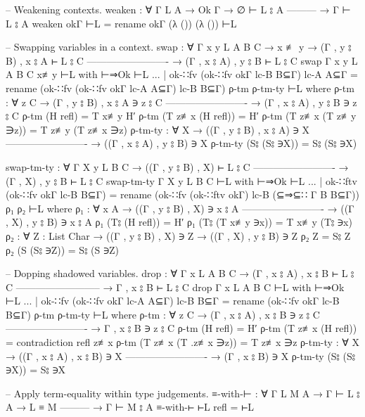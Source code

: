 \documentclass[logo,bsc,singlespacing,parskip,online]{infthesis}
\renewenvironment{code}{\mintedcopy[breaklines,breaksymbolleft=\;]{agda}}{\endmintedcopy}
\begin{document}
\begin{code}
  -- Weakening contexts.
  weaken : ∀ {Γ L A}
    → Ok Γ
    → ∅ ⊢ L ⦂ A
      ---------
    → Γ ⊢ L ⦂ A
  weaken okΓ ⊢L = rename okΓ (λ ()) (λ ()) ⊢L

  -- Swapping variables in a context.
  swap : ∀ {Γ x y L A B C}
    → x ≢ y
    → (Γ , y ⦂ B) , x ⦂ A ⊢ L ⦂ C
      -------------------------
    → (Γ , x ⦂ A) , y ⦂ B ⊢ L ⦂ C
  swap {Γ} {x} {y} {L} {A} {B} {C} x≢y ⊢L with ⊢⇒Ok ⊢L
  ... | ok-∷fv (ok-∷fv okΓ lc-B B⊆Γ) lc-A A⊆Γ =
    rename (ok-∷fv (ok-∷fv okΓ lc-A A⊆Γ) lc-B B⊆Γ) ρ-tm ρ-tm-ty ⊢L
    where
      ρ-tm : ∀ {z C}
        → (Γ , y ⦂ B) , x ⦂ A ∋ z ⦂ C
          -------------------------
        → (Γ , x ⦂ A) , y ⦂ B ∋ z ⦂ C
      ρ-tm (H refl) = T x≢y H′
      ρ-tm (T z≢x (H refl)) = H′
      ρ-tm (T z≢x (T z≢y ∋z)) = T z≢y (T z≢x ∋z)
      ρ-tm-ty : ∀ {X}
        → ((Γ , y ⦂ B) , x ⦂ A) ∋ X
          -------------------------
        → ((Γ , x ⦂ A) , y ⦂ B) ∋ X
      ρ-tm-ty (S⦂ (S⦂ ∋X)) = S⦂ (S⦂ ∋X)

  swap-tm-ty : ∀ {Γ X y L B C}
    → ((Γ , y ⦂ B) , X) ⊢ L ⦂ C
      -------------------------
    → (Γ , X) , y ⦂ B ⊢ L ⦂ C
  swap-tm-ty {Γ} {X} {y} {L} {B} {C} ⊢L with ⊢⇒Ok ⊢L
  ... | ok-∷ftv (ok-∷fv okΓ lc-B B⊆Γ) = rename (ok-∷fv (ok-∷ftv okΓ) lc-B (⊆⇒⊆∷ {Γ} {B} B⊆Γ)) ρ₁ ρ₂ ⊢L
    where
      ρ₁ : ∀ {x A}
        → ((Γ , y ⦂ B) , X) ∋ x ⦂ A
          -------------------------
        → ((Γ , X) , y ⦂ B) ∋ x ⦂ A
      ρ₁ (T⦂ (H refl)) = H′
      ρ₁ (T⦂ (T x≢y ∋x)) = T x≢y (T⦂ ∋x)
      ρ₂ : ∀ {Z : List Char}
        → ((Γ , y ⦂ B) , X) ∋ Z
        → ((Γ , X) , y ⦂ B) ∋ Z
      ρ₂ Z = S⦂ Z
      ρ₂ (S (S⦂ ∋Z)) = S⦂ (S ∋Z)

  -- Dopping shadowed variables.
  drop : ∀ {Γ x L A B C}
    → (Γ , x ⦂ A) , x ⦂ B ⊢ L ⦂ C
      --------------------------
    → Γ , x ⦂ B ⊢ L ⦂ C
  drop {Γ} {x} {L} {A} {B} {C} ⊢L with ⊢⇒Ok ⊢L
  ... | ok-∷fv (ok-∷fv okΓ lc-A A⊆Γ) lc-B B⊆Γ =
    rename (ok-∷fv okΓ lc-B B⊆Γ) ρ-tm ρ-tm-ty ⊢L
    where
      ρ-tm : ∀ {z C}
        → (Γ , x ⦂ A) , x ⦂ B ∋ z ⦂ C
          -------------------------
        → Γ , x ⦂ B ∋ z ⦂ C
      ρ-tm (H refl) = H′
      ρ-tm (T z≢x (H refl)) = contradiction refl z≢x
      ρ-tm (T z≢x (T .z≢x ∋z)) = T z≢x ∋z
      ρ-tm-ty : ∀ {X}
        → ((Γ , x ⦂ A) , x ⦂ B) ∋ X
          -------------------------
        → (Γ , x ⦂ B) ∋ X
      ρ-tm-ty (S⦂ (S⦂ ∋X)) = S⦂ ∋X

  -- Apply term-equality within type judgements.
  ≡-with-⊢ : ∀ {Γ L M A}
    → Γ ⊢ L ⦂ A
    → L ≡ M
      ---------
    → Γ ⊢ M ⦂ A
  ≡-with-⊢ ⊢L refl = ⊢L
\end{code}
\end{document}
